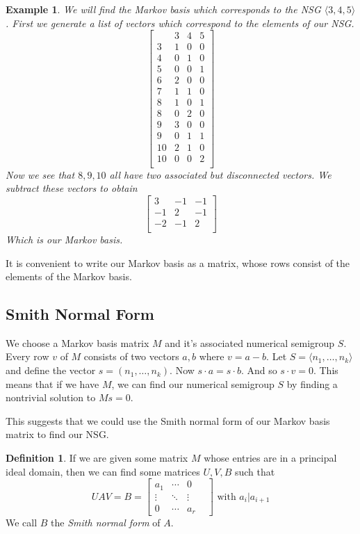 \documentclass[11pt]{amsart}
\theoremstyle{plain}
\newtheorem{exa}{Example}
\theoremstyle{definition}
\newtheorem{defi}{Definition}
\begin{document}
\begin{exa}
  We will find the Markov basis which corresponds to the NSG
$\langle 3,4,5\rangle$. First we generate a list of vectors which correspond
to the elements of our NSG.
\[\left[\begin{array}{r|rrr}
&3&4&5\\
\hline
3&1&0&0\\
4&0&1&0\\
5&0&0&1\\
6&2&0&0\\
7&1&1&0\\
8&1&0&1\\
8&0&2&0\\
9&3&0&0\\
9&0&1&1\\
10&2&1&0\\
10&0&0&2\\
\end{array}\right]
\]
Now we see that $8,9,10$ all have two associated but disconnected vectors. We
subtract these vectors to obtain
\[
  \left[\begin{array}{rrr}
  3&-1&-1\\
  -1&2&-1\\
  -2&-1&2\\
  \end{array}\right]
\]
Which is our Markov basis.
\end{exa}

It is convenient to write our Markov basis as a matrix, whose rows consist of
the elements of the Markov basis.
\subsection{Smith Normal Form}
We choose a Markov basis matrix $M$ and it's associated numerical semigroup $S$.
Every row $v$ of $M$ consists of two vectors $a,b$ where $v=a-b$. Let $S=
\langle n_1,\dots,n_k\rangle$ and define the vector $s=(n_1,\dots,n_k)$. Now
$s\cdot a=s\cdot b$. And so $s\cdot v=0$. This means that if we have $M$, we can
find our numerical semigroup $S$ by finding a nontrivial solution to $Ms=0$.

This suggests that we could use the Smith normal form of our Markov basis matrix
to find our NSG.
\begin{defi}
  If we are given some matrix $M$ whose entries are in a principal ideal domain,
  then we can find some matrices $U,V,B$ such that
\[UAV=B=
\left[\begin{array}{cccc}
  a_1&\cdots&0\\
  \vdots&\ddots&\vdots \\
  0&\cdots&a_r&
\end{array}\right]
\text{ with }a_i|a_{i+1}\]
We call $B$ the \emph{Smith normal form} of $A$.\cite{adkins}
\end{defi}
\end{document}
